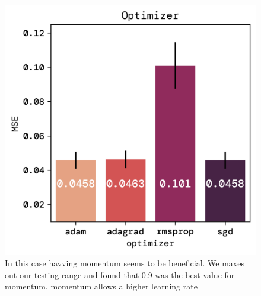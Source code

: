 \documentclass[twoside,11pt]{report}
\begin{document}
    \begin{figure}[!ht]
        \begin{minipage}[t]{0.5\textwidth - 1mm}
            \begin{center}
                \includegraphics[width=\textwidth]{../runsAndFigures/MSE_optimizer.png}
            \end{center}
            \caption{In this case havving momentum seems to be beneficial. We maxes out our testing range and found that 0.9 was the best value for momentum. momentum allows a higher learning rate}\label{fig:MSE_optimizer}
        \end{minipage}
        \hspace{2mm}
        \begin{minipage}[t]{0.5\textwidth - 1mm}
            \begin{center}

\end{center}
\end{minipage}
\end{figure}
\end{document}
